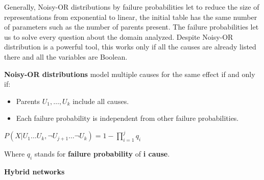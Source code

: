 Generally, Noisy-OR distributions by failure probabilities let to reduce the size of representations from exponential to linear, the initial table has the same number of 
parameters such as the number of parents present. The failure probabilities let us to solve every question about the domain analyzed.
Despite Noisy-OR distribution is a powerful tool, this works only if all the causes are already listed there and all the variables
are Boolean.
\begin{definition}
    \textbf{Noisy-OR distributions} model multiple causes for the same effect if and only if:
    \begin{itemize}
        \renewcommand{\labelitemi}{-}
        \item Parents $U_1, \dots, U_k$ include all causes.
        \item Each failure probability is independent from other failure probabilities.
    \end{itemize} \vspace{7pt}

    \begin{center}
        $P(X|U_1 \dots U_k, \neg U_{j+1} \dots \neg U_k) = 1 - \prod_{i=1}^{j} q_i$
    \end{center} \vspace{3.5pt}

    Where $q_i$ stands for \textbf{failure probability} of \textbf{i cause}.
\end{definition}
\textbf{Hybrid networks} \vspace{3.5pt}

